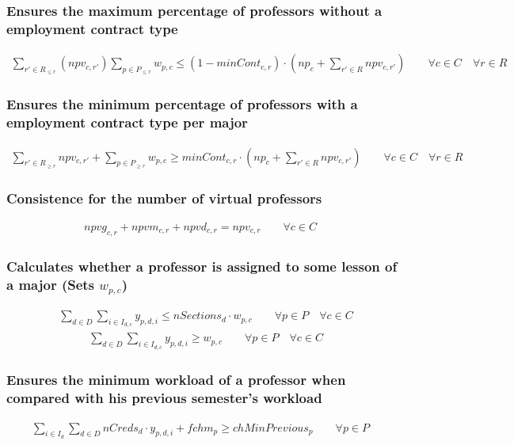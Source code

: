 \subsubsection{Ensures the maximum percentage of professors without a employment contract type}
\begin{eqnarray}
\sum\limits_{r' \in R_{\le r}}( npv_{c,r'} ) \sum\limits_{p \in P_{\le r} } w_{p,c} \le (1-minCont_{c,r}) \cdot (np_{c} + \sum\limits_{r' \in R} npv_{c,r'}) \nonumber \qquad 
\forall c \in C \quad
\forall r \in R
\end{eqnarray}

\subsubsection{Ensures the minimum percentage of professors with a employment contract type per major}
\begin{eqnarray}
\sum\limits_{r' \in R_{\ge r}} npv_{c,r'} + \sum\limits_{p \in P_{\ge r}} w_{p,c} \ge minCont_{c,r} \cdot (np_{c} + \sum\limits_{r' \in R} npv_{c,r'}) \nonumber \qquad 
\forall c \in C \quad
\forall r \in R
\end{eqnarray}

\subsubsection{Consistence for the number of virtual professors}
\begin{eqnarray}
npvg_{c,r} + npvm_{c,r} + npvd_{c,r} = npv_{c,r} \nonumber \qquad 
\forall c \in C \quad
\end{eqnarray}

\subsubsection{Calculates whether a professor is assigned to some lesson of a major (Sets $w_{p,c}$)}
\begin{eqnarray}
\sum\limits_{d \in D} \sum\limits_{i \in I_{d,c}} y_{p,d,i} \le nSections_{d} \cdot w_{p,c} \nonumber \qquad 
\forall p \in P \quad
\forall c \in C
\end{eqnarray}
\begin{eqnarray}
\sum\limits_{d \in D} \sum\limits_{i \in I_{d,c}} y_{p,d,i} \ge w_{p,c} \nonumber \qquad 
\forall p \in P \quad
\forall c \in C
\end{eqnarray}

\subsubsection{Ensures the minimum workload of a professor when compared with his previous semester's workload}
\begin{eqnarray}
\sum\limits_{i \in I_{d}}\sum\limits_{d \in D} nCreds_{d} \cdot y_{p,d,i} + fchm_{p} \ge chMinPrevious_{p} \nonumber \qquad 
\forall p \in P \quad
\end{eqnarray}


